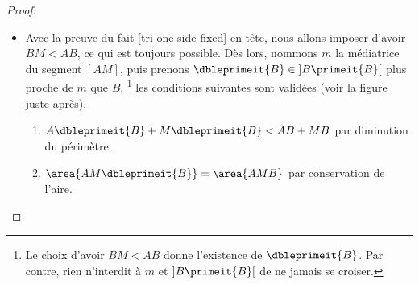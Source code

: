 \begin{proof}
\begin{itemize}
		\item Avec la preuve du fait \ref{tri-one-side-fixed} en tête, nous allons imposer d'avoir $BM < AB$, ce qui est toujours possible.
		Dès lors,
		nommons $m$ la médiatrice du segment $[AM]$,
		puis prenons $\dbleprimeit{B} \in {]B \primeit{B}[}$ plus proche de $m$ que $B$,%
		\footnote{
		    Le choix d'avoir $BM < AB$ donne l'existence de $\dbleprimeit{B}$.
		    Par contre, rien n'interdit à $m$ et $]B \primeit{B}[$ de ne jamais se croiser.
		}
		les conditions suivantes sont validées (voir la figure  juste après).
		\begin{enumerate}
			\item $A \dbleprimeit{B} + M \dbleprimeit{B} < AB + MB$ par diminution du périmètre.

			\item $\area{AM \dbleprimeit{B}} = \area{AMB}$ par conservation de l'aire.


\end{enumerate}
\end{itemize}
\end{proof}
